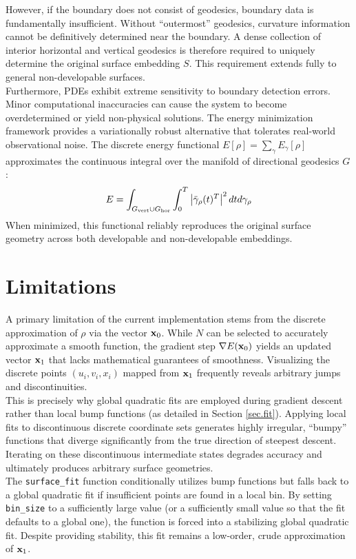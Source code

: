 \documentclass{article}
\newcommand{\grad}{\nabla}
\begin{document}
However, if the boundary does not consist of geodesics, boundary data is fundamentally insufficient. Without ``outermost'' geodesics, curvature information cannot be definitively determined near the boundary. A dense collection of interior horizontal and vertical geodesics is therefore required to uniquely determine the original surface embedding $S$. This requirement extends fully to general non-developable surfaces.\\

Furthermore, PDEs exhibit extreme sensitivity to boundary detection errors. Minor computational inaccuracies can cause the system to become overdetermined or yield non-physical solutions. The energy minimization framework provides a variationally robust alternative that tolerates real-world observational noise. The discrete energy functional $E[\rho] = \sum_\gamma E_\gamma[\rho]$ approximates the continuous integral over the manifold of directional geodesics $G$:
\[
  E = \int_{G_{\text{vert}} \cup G_{\text{hor}}}\int_0^{T} \left\lvert \ddot \gamma_\rho(t)^T \right\rvert^2 dt d\gamma_\rho
\]
When minimized, this functional reliably reproduces the original surface geometry across both developable and non-developable embeddings.

\section{Limitations}\label{sec.lim}
A primary limitation of the current implementation stems from the discrete approximation of $\rho$ via the vector $\mathbf{x}_0$. While $N$ can be selected to accurately approximate a smooth function, the gradient step $\grad E(\vect x_0)$ yields an updated vector $\mathbf{x}_1$ that lacks mathematical guarantees of smoothness. Visualizing the discrete points $(u_i, v_i, x_i)$ mapped from $\mathbf{x}_1$ frequently reveals arbitrary jumps and discontinuities. \\

This is precisely why global quadratic fits are employed during gradient descent rather than local bump functions (as detailed in Section \ref{sec.fit}). Applying local fits to discontinuous discrete coordinate sets generates highly irregular, ``bumpy'' functions that diverge significantly from the true direction of steepest descent. Iterating on these discontinuous intermediate states degrades accuracy and ultimately produces arbitrary surface geometries. \\

The \verb|surface_fit| function conditionally utilizes bump functions but falls back to a global quadratic fit if insufficient points are found in a local bin. By setting \verb|bin_size| to a sufficiently large value (or a
sufficiently small value so that the fit defaults to a global one), the function is forced into a stabilizing global quadratic fit. Despite providing stability, this fit remains a low-order, crude approximation of $\mathbf{x}_1$. \\
\end{document}
